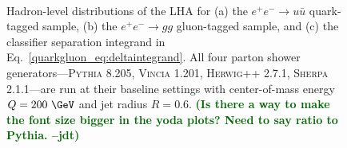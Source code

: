\documentclass[11pt]{cernrep}
\newcommand{\jdt}[1]{\textbf{\textcolor{darkgreen}{(#1 --jdt)}}}
\begin{document}
\begin{figure}
\centering
{}
$\qquad$

\caption{Hadron-level distributions of the LHA for (a) the $e^+ e^- \to u \bar{u}$ quark-tagged sample, (b) the $e^+ e^- \to gg$ gluon-tagged sample, and (c) the classifier separation integrand in Eq.~\eqref{quarkgluon_eq:deltaintegrand}.  All four parton shower generators---\textsc{Pythia 8.205}, \textsc{Vincia 1.201}, \textsc{Herwig++ 2.7.1}, \textsc{Sherpa 2.1.1}---are run at their baseline settings with center-of-mass energy $Q = 200~\GeV$ and jet radius $R= 0.6$.  \jdt{Is there a way to make the font size bigger in the yoda plots?  Need to say ratio to Pythia.}}
\label{quarkgluon_fig:LHA_hadron}
\end{figure}
\end{document}

